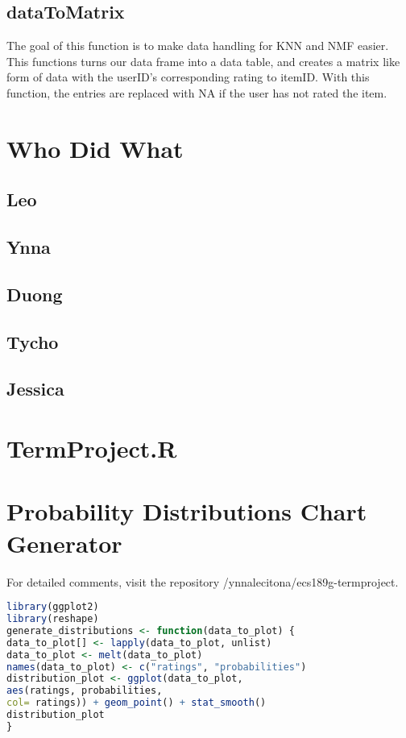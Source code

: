 \documentclass{article}
\begin{document}
\subsection{dataToMatrix} 
The goal of this function is to make data handling for KNN and NMF easier. This functions turns our data frame into a data table, and creates a matrix like form of data with the userID's corresponding rating to itemID. With this function, the entries are replaced with NA if the user has not rated the item. 

\newpage
\section{Who Did What}
\subsection{Leo}

\subsection{Ynna}

\subsection{Duong}

\subsection{Tycho}

\subsection{Jessica}

\newpage
\appendix
\section{TermProject.R}

\section{Probability Distributions Chart Generator}
For detailed comments, visit the repository
/ynnalecitona/ecs189g-termproject.
\begin{lstlisting}[language=R]
library(ggplot2)
library(reshape)
generate_distributions <- function(data_to_plot) {
data_to_plot[] <- lapply(data_to_plot, unlist)
data_to_plot <- melt(data_to_plot)
names(data_to_plot) <- c("ratings", "probabilities")
distribution_plot <- ggplot(data_to_plot, 
aes(ratings, probabilities, 
col= ratings)) + geom_point() + stat_smooth()
distribution_plot
}
\end{lstlisting}
\end{document}

